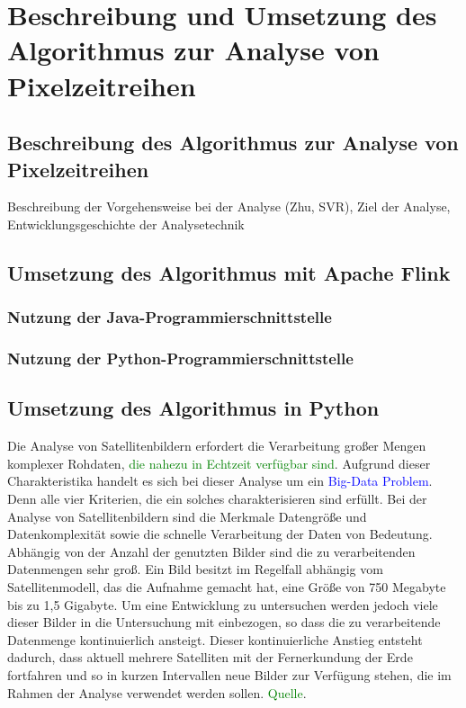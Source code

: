 \chapter[Algorithmus zur Analyse von Pixelzeitreihen]{Beschreibung und Umsetzung des Algorithmus zur Analyse von Pixelzeitreihen}
\section[Beschreibung des Algorithmus]{Beschreibung des Algorithmus zur Analyse von Pixelzeitreihen}
Beschreibung der Vorgehensweise bei der Analyse (Zhu, SVR), Ziel der Analyse, Entwicklungsgeschichte der Analysetechnik
\section{Umsetzung des Algorithmus mit Apache Flink}
\subsection{Nutzung der Java-Programmierschnittstelle}
\subsection{Nutzung der Python-Programmierschnittstelle}
\section{Umsetzung des Algorithmus in Python}
Die Analyse von Satellitenbildern erfordert die Verarbeitung großer Mengen komplexer Rohdaten, \textcolor{green}{die nahezu in Echtzeit verfügbar sind}. Aufgrund dieser Charakteristika handelt es sich bei dieser Analyse um ein \textcolor{blue}{Big-Data Problem}. Denn alle vier Kriterien, die ein solches charakterisieren sind erfüllt.
\newline
Bei der Analyse von Satellitenbildern sind die Merkmale Datengröße und Datenkomplexität sowie die schnelle Verarbeitung der Daten von Bedeutung. Abhängig von der Anzahl der genutzten Bilder sind die zu verarbeitenden Datenmengen sehr groß. Ein Bild besitzt im Regelfall abhängig vom Satellitenmodell, das die Aufnahme gemacht hat, eine Größe von 750 Megabyte bis zu 1,5 Gigabyte. Um eine Entwicklung zu untersuchen werden jedoch viele dieser Bilder in die Untersuchung mit einbezogen, so dass die zu verarbeitende Datenmenge kontinuierlich ansteigt. Dieser kontinuierliche Anstieg entsteht dadurch, dass aktuell mehrere Satelliten mit der Fernerkundung der Erde fortfahren und so in kurzen Intervallen neue Bilder zur Verfügung stehen, die im Rahmen der Analyse verwendet werden sollen. \textcolor{green}{Quelle}.



